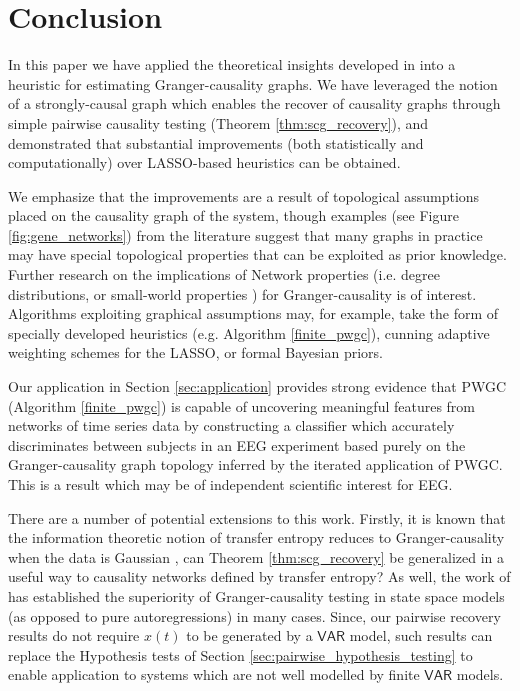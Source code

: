\documentclass[12pt]{article}
\def\VAR{\mathsf{VAR}}  %
\begin{document}
\section{Conclusion}
\label{sec:conclusion}
In this paper we have applied the theoretical insights developed in
\cite{my_GC_paper} into a heuristic for estimating Granger-causality
graphs.  We have leveraged the notion of a strongly-causal graph which
enables the recover of causality graphs through simple pairwise
causality testing (Theorem \ref{thm:scg_recovery}), and demonstrated
that substantial improvements (both statistically and computationally)
over LASSO-based heuristics can be obtained.

We emphasize that the improvements are a result of topological
assumptions placed on the causality graph of the system, though
examples (see Figure \ref{fig:gene_networks}) from the literature
suggest that many graphs in practice may have special topological
properties that can be exploited as prior knowledge.  Further research
on the implications of Network properties (i.e. degree distributions,
or small-world properties ) for
Granger-causality is of interest.  Algorithms exploiting graphical
assumptions may, for example, take the form of specially developed
heuristics (e.g. Algorithm \ref{finite_pwgc}), cunning adaptive
weighting schemes for the LASSO, or formal Bayesian priors.

Our application in Section \ref{sec:application} provides strong
evidence that PWGC (Algorithm \ref{finite_pwgc}) is capable of
uncovering meaningful features from networks of time series data by
constructing a classifier which accurately discriminates between
subjects in an EEG experiment based purely on the Granger-causality
graph topology inferred by the iterated application of PWGC.  This is
a result which may be of independent scientific interest for EEG.

There are a number of potential extensions to this work.  Firstly, it
is known that the information theoretic notion of transfer entropy
reduces to Granger-causality when the data is Gaussian
\cite{barnett2009granger}, can Theorem \ref{thm:scg_recovery} be
generalized in a useful way to causality networks defined by transfer
entropy?  As well, the work of \cite{barnett2015granger} has
established the superiority of Granger-causality testing in state
space models (as opposed to pure autoregressions) in many cases.
Since, our pairwise recovery results do not require $x(t)$ to be
generated by a $\VAR$ model, such results can replace the Hypothesis
tests of Section \ref{sec:pairwise_hypothesis_testing} to enable
application to systems which are not well modelled by finite $\VAR$
models.
\end{document}
